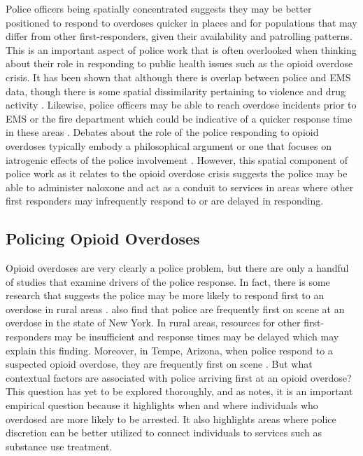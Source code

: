 Police officers being spatially concentrated suggests they may be better positioned to respond to overdoses quicker in places and for populations that may differ from other first-responders, given their availability and patrolling patterns. This is an important aspect of police work that is often overlooked when thinking about their role in responding to public health issues such as the opioid overdose crisis. It has been shown that although there is overlap between police and EMS data, though there is some spatial dissimilarity pertaining to violence and drug activity \parencite{hibdon_concentration_2017, hibdon_going_2021}. Likewise, police officers may be able to reach overdose incidents prior to EMS or the fire department which could be indicative of a quicker response time in these areas \parencite{pourtaher_naloxone_2022, white_leveraging_2022}. Debates about the role of the police responding to opioid overdoses typically embody a philosophical argument or one that focuses on iatrogenic effects of the police involvement \parencite{doe-simkins_whose_2022, michaud_therapeutic_2023, van_der_meulen_thats_2021}. However, this spatial component of police work as it relates to the opioid overdose crisis suggests the police may be able to administer naloxone and act as a conduit to services in areas where other first responders may infrequently respond to or are delayed in responding. 

\subsection{Policing Opioid Overdoses}

Opioid overdoses are very clearly a police problem, but there are only a handful of studies that examine drivers of the police response. In fact, there is some research that suggests the police may be more likely to respond first to an overdose in rural areas \parencite{wood_overdose_2021}. \textcite{pourtaher_naloxone_2022} also find that police are frequently first on scene at an overdose in the state of New York. In rural areas, resources for other first-responders may be insufficient and response times may be delayed which may explain this finding. Moreover, in Tempe, Arizona, when police respond to a suspected opioid overdose, they are frequently first on scene \parencite{white_leveraging_2022}. But what contextual factors are associated with police arriving first at an opioid overdose? This question has yet to be explored thoroughly, and as \textcite{lowder_twoyear_2020} notes, it is an important empirical question because it highlights when and where individuals who overdosed are more likely to be arrested. It also highlights areas where police discretion can be better utilized to connect individuals to services such as substance use treatment.

